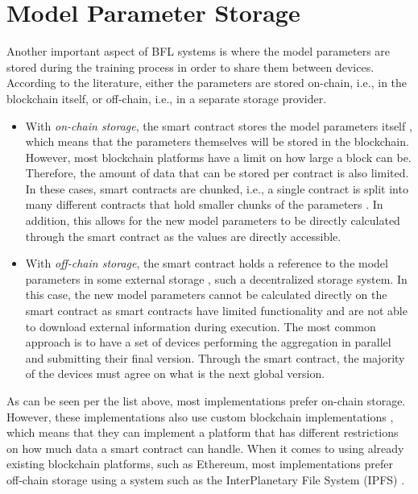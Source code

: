 \section{Model Parameter Storage}

Another important aspect of BFL systems is where the model parameters are stored during the training process in order to share them between devices. According to the literature, either the parameters are stored on-chain, i.e., in the blockchain itself, or off-chain, i.e., in a separate storage provider.

\begin{itemize}
    \item With \textit{on-chain storage}, the smart contract stores the model parameters itself \cite{9274451, baffle, demo, 8733825, 9524833, 8894364, 9184854, 8893114}, which means that the parameters themselves will be stored in the blockchain. However, most blockchain platforms have a limit on how large a block can be. Therefore, the amount of data that can be stored per contract is also limited. In these cases, smart contracts are chunked, i.e., a single contract is split into many different contracts that hold smaller chunks of the parameters \cite{9274451, baffle}. In addition, this allows for the new model parameters to be directly calculated through the smart contract as the values are directly accessible.
    
    \item With \textit{off-chain storage}, the smart contract holds a reference to the model parameters in some external storage \cite{10.48550/arxiv.2202.02817, 10.48550/arxiv.1910.12603, 10.48550/arxiv.2007.03856, 8945913, Peyvandi2022, 9170559, 10.1145/3319535.3363256, 10.48550/arxiv.2011.07516}, such a decentralized storage system. In this case, the new model parameters cannot be calculated directly on the smart contract as smart contracts have limited functionality and are not able to download external information during execution. The most common approach is to have a set of devices performing the aggregation in parallel and submitting their final version. Through the smart contract, the majority of the devices must agree on what is the next global version.
\end{itemize}

As can be seen per the list above, most implementations prefer on-chain storage. However, these implementations also use custom blockchain implementations \cite{8733825, 9524833, 8894364, 9184854, 8893114}, which means that they can implement a platform that has different restrictions on how much data a smart contract can handle. When it comes to using already existing blockchain platforms, such as Ethereum, most implementations prefer off-chain storage using a system such as the InterPlanetary File System (IPFS) \cite{10.48550/arxiv.2007.03856, 8945913, Peyvandi2022, 9170559, 10.1145/3319535.3363256, 10.48550/arxiv.2011.07516}.

